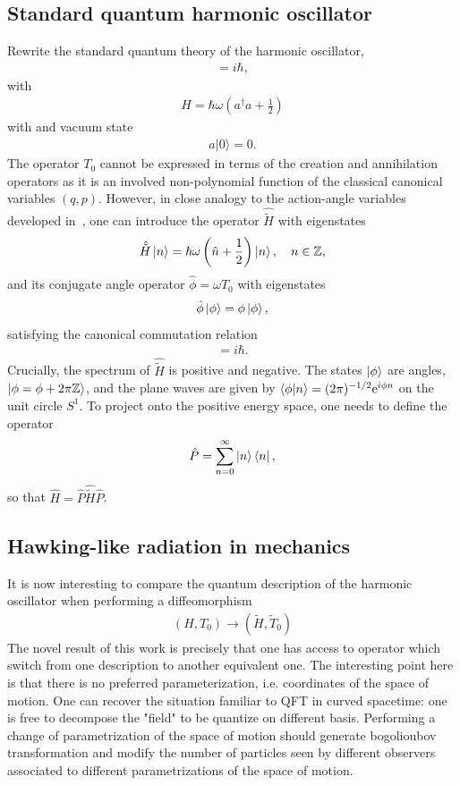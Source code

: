 \documentclass[onecolumn,notitlepage,superscriptaddress, nofootinbib,nobibnotes, aps,prd,10pt]{revtex4-1}%
\def\ra{\rangle }
\def\be{\begin{eqnarray}}
\def\ee{\end{eqnarray}}
\begin{document}
\subsection{Standard quantum harmonic oscillator}

Rewrite the standard quantum theory of the harmonic oscillator,
\be
[a, a^{\dagger}] = i \hbar,
\ee
with
\be
H = \hbar \omega \left( a^\dagger a + \frac{1}{2}\right) 
\ee
with  and vacuum state
\be
a |0 \ra = 0.
\ee
The operator $T_0$ cannot be expressed in terms of the creation and annihilation operators as it is an involved non-polynomial function of the classical canonical variables $(q,p)$. However, in close analogy to the action-angle variables developed in~\cite{Augustin1979}, one can introduce the operator $\hat{\tilde{H}}$  with eigenstates 
\be
\hat{\tilde{H}}\ket{n} = \hbar\omega\left(\hat{n}+\frac{1}{2}\right)\ket{n}, \quad n\in\mathbb{Z},
\ee
and its conjugate angle operator $\hat{\phi} = \omega \hat{T}_0$ with eigenstates
\be
\hat{\phi} \ket{\phi} = \phi \ket{\phi},
\ee
satisfying the canonical commutation relation
\be
[\hat{\phi},\hat{\tilde{H}}/\omega] = i \hbar.
\ee
Crucially, the spectrum of $\hat{\tilde{H}}$ is positive and negative. The states $\ket{\phi}$ are angles, $\ket{\phi = \phi+2\pi\mathbb{Z}}$, and the plane waves are given by $\braket{\phi}{n} = (2\pi)^{-1/2}\mathrm{e}^{i\phi n}$ on the unit circle $S^1$. To project onto the positive energy space, one needs to define the operator
\be
\hat{P} = \sum_{n = 0}^{\infty}\ket{n}\bra{n},
\ee
so that $\hat{H} = \hat{P}\hat{\tilde{H}}\hat{P}$.




\subsection{Hawking-like radiation in mechanics}

It is now interesting to compare the quantum description of the harmonic oscillator when performing a diffeomorphism 
\be
(H, T_0) \rightarrow  (\tilde{H}, \tilde{T}_0)
\ee
The novel result of this work is precisely that one has access to operator which switch from one description to another equivalent one. The interesting point here is that there is no preferred parameterization, i.e. coordinates of the space of motion. One can recover the situation familiar to QFT in curved spacetime: one is free to decompose the "field" to be quantize on different basis. Performing a change of parametrization of the space of motion should generate bogolioubov transformation and modify the number of particles seen by different observers associated to different parametrizations of the space of motion.
\end{document}
